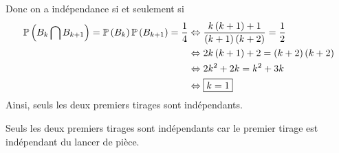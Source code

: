 \begin{solution}
\begin{enumerate}
        Donc on a indépendance si et seulement si 
        \begin{align}
            \P\left(B_{k}\bigcap B_{k+1}\right)=\P\left(B_{k}\right)\P\left(B_{k+1}\right)=\frac{1}{4}
            &\Leftrightarrow \frac{k\left(k+1\right)+1}{\left(k+1\right)\left(k+2\right)}=\frac{1}{2}\\
            &\Leftrightarrow 2k\left(k+1\right)+2=\left(k+2\right)\left(k+2\right)\\
            &\Leftrightarrow 2k^{2}+2k=k^{2}+3k\\
            &\Leftrightarrow \boxed{k=1}
        \end{align}
        Ainsi, seuls les deux premiers tirages sont indépendants.
    \end{enumerate}
\end{solution}

\begin{remark}
    Seuls les deux premiers tirages sont indépendants car le premier tirage est indépendant du lancer de pièce.
\end{remark}

